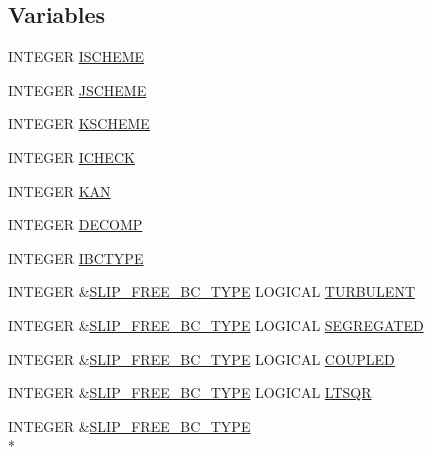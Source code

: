 \subsection*{Variables}
\begin{DoxyCompactItemize}
\item 
I\-N\-T\-E\-G\-E\-R \hyperlink{flags_8com_a2a5c33e10743241daf1d588271535cbd}{I\-S\-C\-H\-E\-M\-E}
\item 
I\-N\-T\-E\-G\-E\-R \hyperlink{flags_8com_a1083bd312818afd916c7d337fc2f522f}{J\-S\-C\-H\-E\-M\-E}
\item 
I\-N\-T\-E\-G\-E\-R \hyperlink{flags_8com_adeb56587b709e4a5e4c069fc1212f8d4}{K\-S\-C\-H\-E\-M\-E}
\item 
I\-N\-T\-E\-G\-E\-R \hyperlink{flags_8com_a820fad8822140443f9e99a14c76dc711}{I\-C\-H\-E\-C\-K}
\item 
I\-N\-T\-E\-G\-E\-R \hyperlink{flags_8com_a8ba8c3e1746d1dda10a6169c712e8471}{K\-A\-N}
\item 
I\-N\-T\-E\-G\-E\-R \hyperlink{flags_8com_a2d201f6361052b3dba0b5364e26a9321}{D\-E\-C\-O\-M\-P}
\item 
I\-N\-T\-E\-G\-E\-R \hyperlink{flags_8com_a1ab85a12f47d078d88be0df3c8e032f5}{I\-B\-C\-T\-Y\-P\-E}
\item 
I\-N\-T\-E\-G\-E\-R \&\hyperlink{flags_8com_a6beb6f16ff7301fc1f9a031b0f564045}{S\-L\-I\-P\-\_\-\-F\-R\-E\-E\-\_\-\-B\-C\-\_\-\-T\-Y\-P\-E} L\-O\-G\-I\-C\-A\-L \hyperlink{flags_8com_a874e0741db8fe8daec6f320acfeed044}{T\-U\-R\-B\-U\-L\-E\-N\-T}
\item 
I\-N\-T\-E\-G\-E\-R \&\hyperlink{flags_8com_a6beb6f16ff7301fc1f9a031b0f564045}{S\-L\-I\-P\-\_\-\-F\-R\-E\-E\-\_\-\-B\-C\-\_\-\-T\-Y\-P\-E} L\-O\-G\-I\-C\-A\-L \hyperlink{flags_8com_a130d80cc54a859d28cc70c83f2ea3b16}{S\-E\-G\-R\-E\-G\-A\-T\-E\-D}
\item 
I\-N\-T\-E\-G\-E\-R \&\hyperlink{flags_8com_a6beb6f16ff7301fc1f9a031b0f564045}{S\-L\-I\-P\-\_\-\-F\-R\-E\-E\-\_\-\-B\-C\-\_\-\-T\-Y\-P\-E} L\-O\-G\-I\-C\-A\-L \hyperlink{flags_8com_ab547235acca8df0c0afedd7ec0e93f24}{C\-O\-U\-P\-L\-E\-D}
\item 
I\-N\-T\-E\-G\-E\-R \&\hyperlink{flags_8com_a6beb6f16ff7301fc1f9a031b0f564045}{S\-L\-I\-P\-\_\-\-F\-R\-E\-E\-\_\-\-B\-C\-\_\-\-T\-Y\-P\-E} L\-O\-G\-I\-C\-A\-L \hyperlink{flags_8com_af9eac3cee045cc6d88e08005d02f153c}{L\-T\-S\-Q\-R}
\item 
I\-N\-T\-E\-G\-E\-R \&\hyperlink{flags_8com_a6beb6f16ff7301fc1f9a031b0f564045}{S\-L\-I\-P\-\_\-\-F\-R\-E\-E\-\_\-\-B\-C\-\_\-\-T\-Y\-P\-E} \\*

\end{DoxyCompactItemize}
